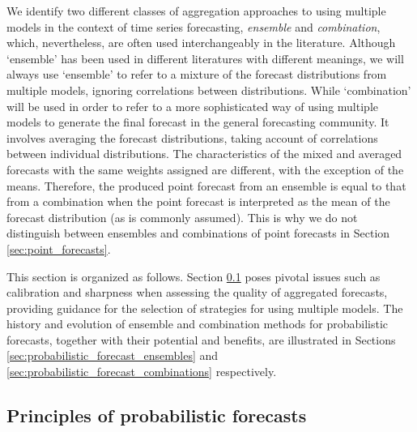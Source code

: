\documentclass[11pt]{article}
\begin{document}
We identify two different classes of aggregation approaches to using multiple models in the context of time series forecasting, \textit{ensemble} and \textit{combination}, which, nevertheless, are often used interchangeably in the literature. Although `ensemble' has been used in different literatures with different meanings, we will always use `ensemble' to refer to a mixture of the forecast distributions from multiple models, ignoring correlations between distributions. While `combination' will be used in order to refer to a more sophisticated way of using multiple models to generate the final forecast in the general forecasting community. It involves averaging the forecast distributions, taking account of correlations between individual distributions. The characteristics of the mixed and averaged forecasts with the same weights assigned are different, with the exception of the means. Therefore, the produced point forecast from an ensemble is equal to that from a combination when the point forecast is interpreted as the mean of the forecast distribution (as is commonly assumed). This is why we do not distinguish between ensembles and combinations of point forecasts in Section \ref{sec:point_forecasts}.

This section is organized as follows. Section \ref{sec:principles_of_probabilistic_forecasts} poses pivotal issues such as calibration and sharpness when assessing the quality of aggregated forecasts, providing guidance for the selection of strategies for using multiple models. The history and evolution of ensemble and combination methods for probabilistic forecasts, together with their potential and benefits, are illustrated in Sections \ref{sec:probabilistic_forecast_ensembles} and \ref{sec:probabilistic_forecast_combinations} respectively.

\subsection{Principles of probabilistic forecasts}
\label{sec:principles_of_probabilistic_forecasts}
\end{document}

